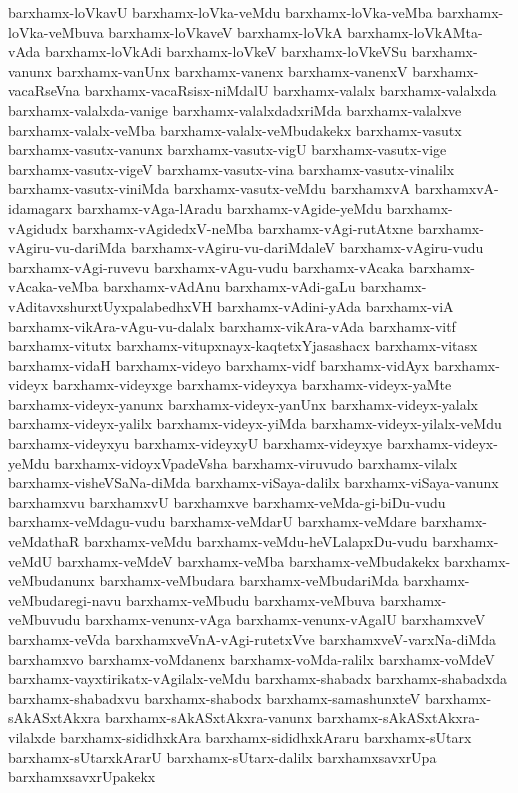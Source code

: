 {barxhamx-loVkavU
barxhamx-loVka-veMdu
barxhamx-loVka-veMba
barxhamx-loVka-veMbuva
barxhamx-loVkaveV
barxhamx-loVkA
barxhamx-loVkAMta-vAda
barxhamx-loVkAdi
barxhamx-loVkeV
barxhamx-loVkeVSu
barxhamx-vanunx
barxhamx-vanUnx
barxhamx-vanenx
barxhamx-vanenxV
barxhamx-vacaRseVna
barxhamx-vacaRsisx-niMdalU
barxhamx-valalx
barxhamx-valalxda
barxhamx-valalxda-vanige
barxhamx-valalxdadxriMda
barxhamx-valalxve
barxhamx-valalx-veMba
barxhamx-valalx-veMbudakekx
barxhamx-vasutx
barxhamx-vasutx-vanunx
barxhamx-vasutx-vigU
barxhamx-vasutx-vige
barxhamx-vasutx-vigeV
barxhamx-vasutx-vina
barxhamx-vasutx-vinalilx
barxhamx-vasutx-viniMda
barxhamx-vasutx-veMdu
barxhamxvA
barxhamxvA-idamagarx
barxhamx-vAga-lAradu
barxhamx-vAgide-yeMdu
barxhamx-vAgidudx
barxhamx-vAgidedxV-neMba
barxhamx-vAgi-rutAtxne
barxhamx-vAgiru-vu-dariMda
barxhamx-vAgiru-vu-dariMdaleV
barxhamx-vAgiru-vudu
barxhamx-vAgi-ruvevu
barxhamx-vAgu-vudu
barxhamx-vAcaka
barxhamx-vAcaka-veMba
barxhamx-vAdAnu
barxhamx-vAdi-gaLu
barxhamx-vAditavxshurxtUyxpalabedhxVH
barxhamx-vAdini-yAda
barxhamx-viA
barxhamx-vikAra-vAgu-vu-dalalx
barxhamx-vikAra-vAda
barxhamx-vitf
barxhamx-vitutx
barxhamx-vitupxnayx-kaqtetxYjasashacx
barxhamx-vitasx
barxhamx-vidaH
barxhamx-videyo
barxhamx-vidf
barxhamx-vidAyx
barxhamx-videyx
barxhamx-videyxge
barxhamx-videyxya
barxhamx-videyx-yaMte
barxhamx-videyx-yanunx
barxhamx-videyx-yanUnx
barxhamx-videyx-yalalx
barxhamx-videyx-yalilx
barxhamx-videyx-yiMda
barxhamx-videyx-yilalx-veMdu
barxhamx-videyxyu
barxhamx-videyxyU
barxhamx-videyxye
barxhamx-videyx-yeMdu
barxhamx-vidoyxVpadeVsha
barxhamx-viruvudo
barxhamx-vilalx
barxhamx-visheVSaNa-diMda
barxhamx-viSaya-dalilx
barxhamx-viSaya-vanunx
barxhamxvu
barxhamxvU
barxhamxve
barxhamx-veMda-gi-biDu-vudu
barxhamx-veMdagu-vudu
barxhamx-veMdarU
barxhamx-veMdare
barxhamx-veMdathaR
barxhamx-veMdu
barxhamx-veMdu-heVLalapxDu-vudu
barxhamx-veMdU
barxhamx-veMdeV
barxhamx-veMba
barxhamx-veMbudakekx
barxhamx-veMbudanunx
barxhamx-veMbudara
barxhamx-veMbudariMda
barxhamx-veMbudaregi-navu
barxhamx-veMbudu
barxhamx-veMbuva
barxhamx-veMbuvudu
barxhamx-venunx-vAga
barxhamx-venunx-vAgalU
barxhamxveV
barxhamx-veVda
barxhamxveVnA-vAgi-rutetxVve
barxhamxveV-varxNa-diMda
barxhamxvo
barxhamx-voMdanenx
barxhamx-voMda-ralilx
barxhamx-voMdeV
barxhamx-vayxtirikatx-vAgilalx-veMdu
barxhamx-shabadx
barxhamx-shabadxda
barxhamx-shabadxvu
barxhamx-shabodx
barxhamx-samashunxteV
barxhamx-sAkASxtAkxra
barxhamx-sAkASxtAkxra-vanunx
barxhamx-sAkASxtAkxra-vilalxde
barxhamx-sididhxkAra
barxhamx-sididhxkAraru
barxhamx-sUtarx
barxhamx-sUtarxkArarU
barxhamx-sUtarx-dalilx
barxhamxsavxrUpa
barxhamxsavxrUpakekx
}
